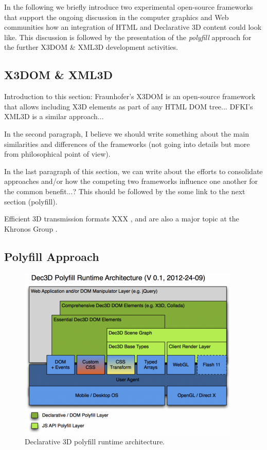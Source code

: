 \documentclass[review]{acmsiggraph}
\begin{document}
In the following we briefly introduce two experimental open-source frameworks that support the ongoing discussion in the computer graphics and Web communities how an integration of HTML and Declarative 3D content could look like. This discussion is followed by the presentation of the \textit{polyfill} approach for the further X3DOM \& XML3D development activities.

\subsection{X3DOM \& XML3D}
Introduction to this section: Fraunhofer's X3DOM \cite{Behr2009,Behr12} is an open-source framework that allows including X3D \cite{Web3D-X3D} elements as part of any HTML DOM tree... DFKI's XML3D \cite{Sons2010} is a similar approach...

In the second paragraph, I believe we should write something about the main similarities and differences of the frameworks (not going into details but more from philosophical point of view).

In the last paragraph of this section, we can write about the efforts to consolidate approaches and/or how the competing two frameworks influence one another for the common benefit...? This should be followed by the some link to the next section (polyfill).

Efficient 3D transmission formats XXX \cite{Behr12}, and are also a major topic at the Khronos Group \cite{Trevett12}.


\subsection{Polyfill Approach}

\begin{figure}%
  \centering
  \includegraphics[width=\linewidth]{images/Dec3D-Architecture.png}
  \caption{Declarative 3D polyfill runtime architecture.}
\end{figure}
\end{document}
